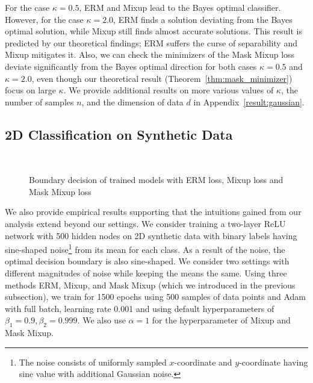 For the case $\kappa = 0.5$, ERM and Mixup lead to the Bayes optimal classifier. However, for the case $\kappa = 2.0$, ERM finds a solution deviating from the Bayes optimal solution, while Mixup still finds almost accurate solutions. This result is predicted by our theoretical findings; ERM suffers the curse of separability and Mixup mitigates it. Also, we can check the minimizers of the Mask Mixup loss deviate significantly from the Bayes optimal direction for both cases $\kappa = 0.5$ and $\kappa = 2.0$, even though our theoretical result (Theorem~\ref{thm:mask_minimizer}) focus on large $\kappa$. We provide additional results on more various values of $\kappa$, the number of samples $n$, and the dimension of data $d$ in Appendix~\ref{result:gaussian}.
\vspace{-5pt}
\subsection{2D Classification on Synthetic Data} \label{exp:2d}
\vspace{-5pt}
\begin{figure*}[h]
    \vspace{-10pt}
    \centering
    ~
    \vspace{-10pt}
    \caption{Boundary decision of trained models with ERM loss, Mixup loss and Mask Mixup loss}
    \vspace{-10pt}
    \label{figure:2d}
    \vspace{-5pt}
\end{figure*}
We also provide empirical results supporting that the intuitions gained from our analysis extend beyond our settings. We consider training a two-layer ReLU network with 500 hidden nodes on 2D synthetic data with binary labels having sine-shaped noise\footnote{The noise consists of uniformly sampled $x$-coordinate and $y$-coordinate having sine value with additional Gaussian noise.} from its mean for each class. As a result of the noise, the optimal decision boundary is also sine-shaped.
We consider two settings with different magnitudes of noise while keeping the means the same. 
Using three methods ERM, Mixup, and Mask Mixup (which we introduced in the previous subsection), we train for 1500 epochs using 500 samples of data points and Adam \citep{kingma2014adam} with full batch, learning rate 0.001 and using default hyperparameters of $\beta_1 = 0.9, \beta_2 = 0.999$. We also use $\alpha=1$ for the hyperparameter of Mixup and Mask Mixup. 

